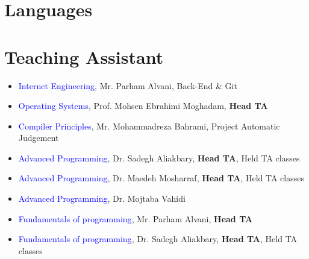 \documentclass[11pt,a4paper,sans]{moderncv}
\begin{document}
\vspace{-1em}
\section{Languages}



\vspace{-1em}
\section{Teaching Assistant}
\begin{itemize}
\item \textcolor{blue}{Internet Engineering}, Mr. Parham Alvani, Back-End \& Git
\item \textcolor{blue}{Operating Systems}, Prof. Mohsen Ebrahimi Moghadam, \textbf{Head TA}
\item \textcolor{blue}{Compiler Principles}, Mr. Mohammadreza Bahrami, Project Automatic Judgement
\item \textcolor{blue}{Advanced Programming}, Dr. Sadegh Aliakbary, \textbf{Head TA}, Held TA classes 
\item \textcolor{blue}{Advanced Programming}, Dr. Maedeh Mosharraf, \textbf{Head TA}, Held TA classes
\item \textcolor{blue}{Advanced Programming}, Dr. Mojtaba Vahidi
\item \textcolor{blue}{Fundamentals of programming}, Mr. Parham Alvani, \textbf{Head TA}
\item \textcolor{blue}{Fundamentals of programming}, Dr. Sadegh Aliakbary, \textbf{Head TA}, Held TA classes
\end{itemize}

\vspace{-0.55em}
\end{document}
